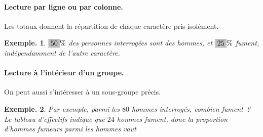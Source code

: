 \documentclass[12pt]{article}
\theoremstyle{break}
\newtheorem*{example}{Exemple.}
\begin{document}
\paragraph{Lecture par ligne ou par colonne.} Les totaux donnent la répartition de chaque caractère pris isolément.

\begin{example}
   $\hideM{50}\%$ des personnes interrogées sont des hommes, et $\hideM{25}\%$ fument, indépendamment de l'autre caractère.
\end{example}

\vspace{-1em}
 
\paragraph{Lecture à l'intérieur d'un groupe.} On peut aussi s'intéresser à un sous-groupe précis.
\begin{example}
Par exemple, parmi les $80$ hommes interrogés, combien fument~? Le tableau d'effectifs indique que $24$ hommes fument, donc la proportion d'hommes fumeurs \emph{parmi les hommes} vaut
  
  \vspace{0.2em}
  \framebox[1\linewidth]{\parbox{5.5in}{%
  \[
  \hideMW{\frac{24}{80} = 0{,}3 \quad \text{soit } 30\%.}
  \]
  \vspace{-1em}
  }}
\end{example}
\end{document}
